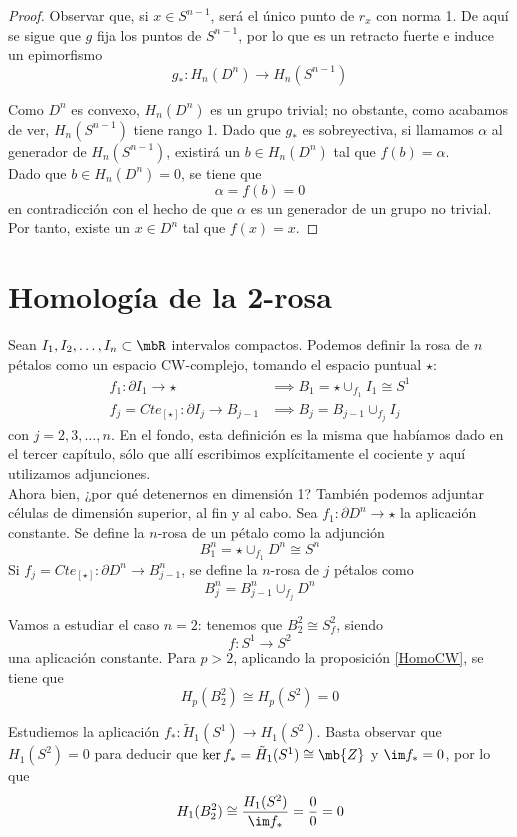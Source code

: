 \begin{proof}
Observar que, si $x \in S^{n-1}$, será el único punto de $r_x$ con norma 1. De aquí se sigue que $g$ fija los puntos de $S^{n-1}$, por lo que es un retracto fuerte e induce un epimorfismo $$g_*: H_n(D^n) \longrightarrow H_n(S^{n-1})$$

Como $D^n$ es convexo, $H_n(D^n)$ es un grupo trivial; no obstante, como acabamos de ver, $H_n(S^{n-1})$ tiene rango 1. Dado que $g_*$ es sobreyectiva, si llamamos $\alpha$ al generador de $H_n(S^{n-1})$, existirá un $b \in H_n(D^n)$ tal que $f(b)=\alpha$.
\\

Dado que $b \in H_n(D^n)=0$, se tiene que $$\alpha=f(b)=0$$ en contradicción con el hecho de que $\alpha$ es un generador de un grupo no trivial. Por tanto, existe un $x \in D^n$ tal que $f(x)=x$.
\end{proof}

\section{Homología de la 2-rosa}
Sean $I_1,I_2, \dots, I_n \subset \mbR$ intervalos compactos. Podemos definir la rosa de $n$ pétalos como un espacio CW-complejo, tomando el espacio puntual $\star$:
\begin{align*}
f_1: \partial I_1 \longrightarrow \star &\implies B_1=\star \cup_{f_1} I_1 \cong S^1\\
f_j=Cte_{[\star]}: \partial I_j \longrightarrow B_{j-1} &\implies B_j=B_{j-1}\cup_{f_j} I_j
\end{align*}
con $j=2,3,\dots, n$. En el fondo, esta definición es la misma que habíamos dado en el tercer capítulo, sólo que allí escribimos explícitamente el cociente y aquí utilizamos adjunciones.
\\

Ahora bien, ¿por qué detenernos en dimensión 1? También podemos adjuntar células de dimensión superior, al fin y al cabo. Sea $f_1: \partial D^n \longrightarrow \star$ la aplicación constante. Se define la $n$-rosa de un pétalo como la adjunción \[B^n_1=\star \cup_{f_1} D^n \cong S^n\] Si $f_j=Cte_{[\star]}: \partial D^n \longrightarrow B^n_{j-1}$, se define la $n$-rosa de $j$ pétalos como $$B^n_j=B^n_{j-1}\cup_{f_j} D^n$$

Vamos a estudiar el caso $n=2$: tenemos que $B^2_2\cong S^2_f$, siendo $$f: S^1 \longrightarrow S^2$$ una aplicación constante. Para $p > 2$, aplicando la proposición \ref{HomoCW}, se tiene que \[H_p(B^2_2)\cong H_p(S^2)=0\]

Estudiemos la aplicación $f_*: \tilde{H}_1(S^1) \longrightarrow H_1(S^2)$. Basta observar que $H_1(S^2)=0$ para deducir que $\ker f_*=\tilde{H}_1(S^1) \cong \mb{Z}$ y $\im f_*=0$, por lo que \[H_1(B^2_2)\cong \frac{H_1(S^2)}{\im f_*}=\frac{0}{0}=0\]

